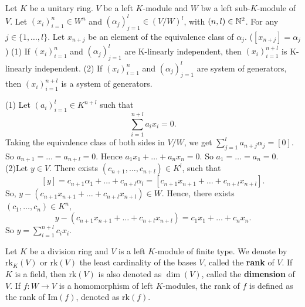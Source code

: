 \documentclass{book}
\numberwithin{equation}{section}
\begin{document}
\begin{theoremenv}\label{6.10.5}
    Let $K$ be a unitary ring. $V$ be a left $K$-module  and $W$ bw a left sub-$K$-module of $V$. Let $(x_i)_{i=1}^{n}\in W^n$ and $\left(\alpha_j\right)_{j=1}^l\in \left(V/W\right)^l$, with $(n,l)\in \mathbb{N}^2$. For any $j\in \{1,\dots,l\}$. Let $x_{n+j}$ be an element of the equivalence class of $\alpha_j$. ($[x_{n+j}]=\alpha_j$)
    \newline
    (1) If $(x_i)_{i=1}^n$ and $(\alpha_j)_{j=1}^l$ are K-linearly independent, then $(x_i)_{i=1}^{n+l}$ is K-linearly independent.
    \newline
    (2) If $(x_i)_{i=1}^{n}$ and $(\alpha_j)_{j=1}^l$ are system of generators, then $(x_i)_{i=1}^{n+l}$ is a system of generators. 
\end{theoremenv}
\begin{proofenv}
    \quad\newline
    (1) Let $(a_i)_{i=1}^l\in K^{n+l}$ such that 
    $$\sum_{i=1}^{n+l}a_ix_i=0.$$
    Taking the equivalence class of both sides in $V/W$, we get $\displaystyle \sum_{j=1}^{l}a_{n+j}\alpha_j=[0]$. So $a_{n+1}=\dots=a_{n+l}=0$. Hence $a_1x_1+\dots+a_nx_n=0$. So $a_1=\dots=a_n=0$.
    \newline
    (2)Let $y\in V$. There exists $(c_{n+1},\dots,c_{n+l})\in K^l$, such that 
    $$[y]=c_{n+1}\alpha_1+\dots +c_{n+l}\alpha_l=[c_{n+1}x_{n+1}+\dots+c_{n+l}x_{n+l}].$$
    So, $y-\left(c_{n+1}x_{n+1}+\dots+c_{n+l}x_{n+l}\right)\in W$. Hence, there exists $(c_1,\dots,c_n)\in K^n$,
    $$y-\left(c_{n+1}x_{n+1}+\dots+c_{n+l}x_{n+l}\right)=c_1x_1+\dots+c_nx_n.$$
    So $\displaystyle y= \sum_{i=1}^{n+l}c_ix_i$.
\end{proofenv}
\begin{definitionenv}
    Let $K$ be a division ring and $V$ is a left $K$-module of finite type. We denote by $\mathrm{rk}_K(V)$ or $\mathrm{rk}(V)$ the least cardinality of the bases $V$, called the \textbf{rank} of $V$. If $K$ is a field, then $\mathrm{rk}(V)$ is also denoted as $\dim(V)$, called the \textbf{dimension} of $V$. If $f:W\longrightarrow V$ is a homomorphism of left $K$-modules, the rank of $f$ is defined as the rank of $\mathrm{Im}(f)$, denoted as $\mathrm{rk}(f)$.
\end{definitionenv}
\end{document}
